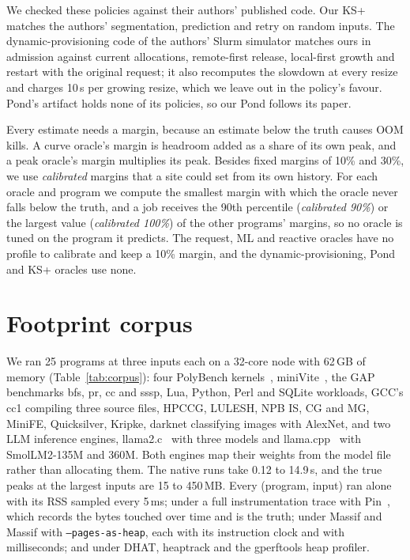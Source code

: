 \documentclass[11pt]{article}
\newcommand{\tabref}[1]{Table~\ref{#1}}
\newcommand{\term}[1]{\emph{#1}}
\begin{document}
We checked these policies against their authors' published code. Our KS+ matches the authors' segmentation, prediction
and retry on random inputs. The dynamic-provisioning code of the authors' Slurm simulator matches ours in admission
against current allocations, remote-first release, local-first growth and restart with the original request; it also
recomputes the slowdown at every resize and charges 10\,s per growing resize, which we leave out in the policy's favour.
Pond's artifact holds none of its policies, so our Pond follows its paper.

Every estimate needs a margin, because an estimate below the truth causes OOM kills. A curve oracle's margin is headroom
added as a share of its own peak, and a peak oracle's margin multiplies its peak. Besides fixed margins of 10\% and 30\%,
we use \term{calibrated} margins that a site could set from its own history. For each oracle and program we compute the
smallest margin with which the oracle never falls below the truth, and a job receives the 90th percentile
(\term{calibrated 90\%}) or the largest value (\term{calibrated 100\%}) of the other programs' margins, so no oracle is
tuned on the program it predicts. The request, ML and reactive oracles have no profile to calibrate and keep a 10\% margin,
and the dynamic-provisioning, Pond and KS+ oracles use none.

\section{Footprint corpus}
\label{sec:corpus}

We ran 25 programs at three inputs each on a 32-core node with 62\,GB of memory (\tabref{tab:corpus}): four PolyBench
kernels~\cite{polybench}, miniVite~\cite{minivite}, the GAP benchmarks bfs, pr, cc and sssp, Lua, Python, Perl and SQLite
workloads, GCC's cc1 compiling three source files, HPCCG, LULESH, NPB IS, CG and MG, MiniFE, Quicksilver, Kripke, darknet
classifying images with AlexNet, and two LLM inference engines, llama2.c~\cite{llama2c} with three models and
llama.cpp~\cite{llamacpp} with SmolLM2-135M and 360M. Both engines map their weights from the model file rather than
allocating them. The native runs take 0.12 to 14.9\,s, and the true peaks at the largest inputs are 15 to 450\,MB. Every
(program, input) ran alone with its RSS sampled every 5\,ms; under a full instrumentation trace with Pin~\cite{Luk2005Pin},
which records the bytes touched over time and is the truth; under Massif and Massif with \texttt{--pages-as-heap},
each with its instruction clock and with milliseconds; and under DHAT, heaptrack and the gperftools heap profiler.
\end{document}
